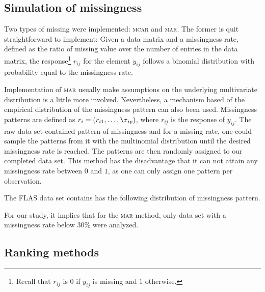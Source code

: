 \subsection{Simulation of missingness}

Two types of missing were implemented: \textsc{mcar} and \textsc{mar}. The
former is quit straightforward to implement: Given a data matrix and a
missingness rate, defined as the ratio of missing value over the number of
entries in the data matrix, the response\footnote{Recall that $r_{ij}$ is $0$
  if $y_{ij}$ is missing and $1$ otherwise.} $r_{ij}$ for the element $y_{ij}$
follows a binomial distribution with probability equal to the missingness rate.

Implementation of \textsc{mar} usually make assumptions on the underlying
multivariate distribution is a little more involved. Nevertheless, a mechanism
based of the empirical distribution of the missingness pattern can also been
used. Missingness patterns are defined as $r_{i} = (r_{i1}, \dots, \r_{ip})$,
where $r_{ij}$ is the response of $y_{ij}$. The raw data set contained pattern
of missingness and for a missing rate, one could sample the patterns from it
with the multinomial distribution until the desired missingness rate is
reached. The patterns are then randomly assigned to our completed data
set. This method has the disadvantage that it can not attain any missingness
rate between $0$ and $1$, as one can only assign one pattern per observation.

The FLAS data set contains has the following distribution of missingness pattern.


For our study, it implies that for the \textsc{mar} method, only data set with
a missingness rate below 30\% were analyzed.

\subsection{Ranking methods}

